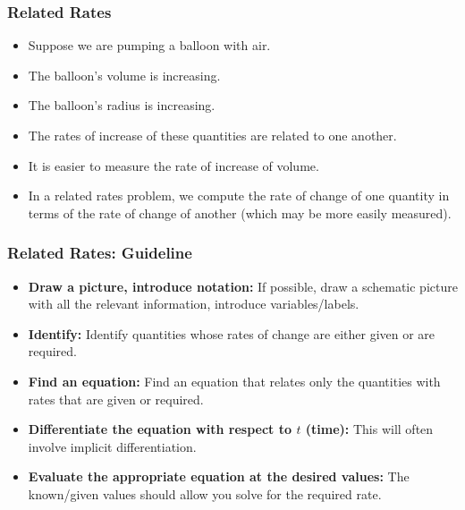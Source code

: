 \begin{frame}
\frametitle{Related Rates}
\begin{itemize}
\item  Suppose we are pumping a balloon with air.
\item  The balloon's volume is increasing.
\item  The balloon's radius is increasing.
\item  The rates of increase of these quantities are related to one another.
\item It is easier to measure the rate of increase of volume.
\item<2->  In a related rates problem, we compute the rate of change of one quantity in terms of the rate of change of another (which may be more easily measured).
\end{itemize}
\end{frame}

\begin{frame}
\frametitle{Related Rates: Guideline}
\begin{itemize}
\item \textbf{Draw a picture, introduce notation:}  If possible, draw a schematic picture with all the relevant information, introduce variables/labels. 
\item \textbf{Identify:}  Identify quantities whose rates of change are either given or are required.
\item \textbf{Find an equation:} Find an equation that relates only the quantities with rates that are given or required. 
\item \textbf{Differentiate the equation with respect to $ t $ (time):}  This will often involve implicit differentiation.
\item \textbf{Evaluate the appropriate equation at the desired values:}   The known/given values   should allow you solve for the required rate.
\end{itemize}
\end{frame}

